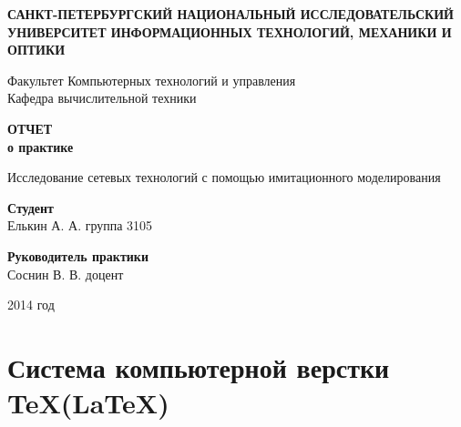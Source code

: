 \documentclass[14pt,a4paper]{article}
\begin{document}
\thispagestyle{empty}

\begin{center}
\textbf{САНКТ-ПЕТЕРБУРГСКИЙ НАЦИОНАЛЬНЫЙ ИССЛЕДОВАТЕЛЬСКИЙ УНИВЕРСИТЕТ ИНФОРМАЦИОННЫХ ТЕХНОЛОГИЙ, 
МЕХАНИКИ И ОПТИКИ}

Факультет Компьютерных технологий и управления\\
Кафедра вычислительной техники
\end{center}
\vspace{2.5cm}

\begin{center}
\textbf{ОТЧЕТ}
\\
\textbf{о практике}

Исследование сетевых технологий с помощью имитационного моделирования
\end{center}

\vspace{2.5cm}

\begin{flushright}
\textbf{Студент}\\
Елькин А. А. группа 3105

\textbf{Руководитель практики}\\
Соснин В. В. доцент
\end{flushright}
\vspace{6cm}
\begin{center}
2014 год
\end{center}
\newpage
\tableofcontents
\newpage
\section{Система компьютерной верстки \TeX(\LaTeX)}
\end{document}
